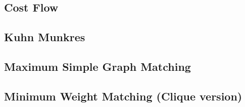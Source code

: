 \documentclass[a4paper,10pt,twocolumn,oneside]{article}
\begin{document}
\subsection{Cost Flow} %


%

\subsection{Kuhn Munkres}


%

\subsection{Maximum Simple Graph Matching}


\subsection{Minimum Weight Matching (Clique version)}


%


%

%
\end{document}

